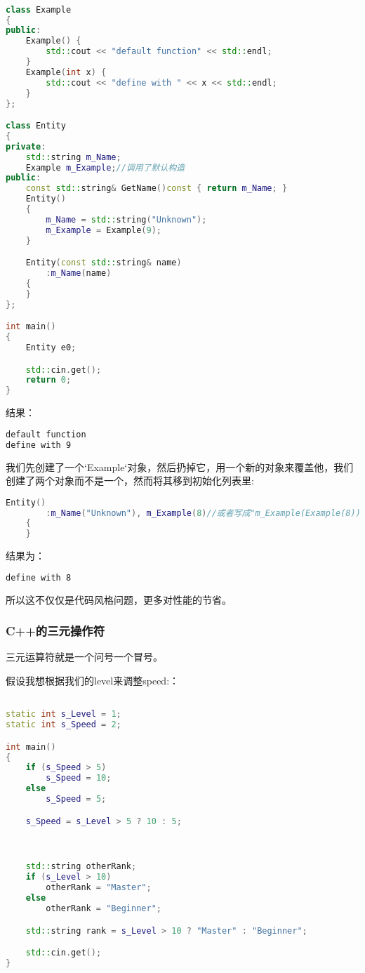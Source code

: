 \begin{lstlisting}[language=c++]

class Example
{
public:
    Example() {
        std::cout << "default function" << std::endl;
    }
    Example(int x) {
        std::cout << "define with " << x << std::endl;
    }
};

class Entity
{
private:
    std::string m_Name;
    Example m_Example;//调用了默认构造
public:
    const std::string& GetName()const { return m_Name; }
    Entity()
    {
        m_Name = std::string("Unknown");
        m_Example = Example(9);
    }

    Entity(const std::string& name)
        :m_Name(name)
    {
    }
};

int main()
{
    Entity e0;

    std::cin.get();
    return 0;
}

\end{lstlisting}

结果：

\begin{lstlisting}[language=bash]
default function
define with 9
\end{lstlisting}

我们先创建了一个`Example`对象，然后扔掉它，用一个新的对象来覆盖他，我们创建了两个对象而不是一个，然而将其移到初始化列表里:

\begin{lstlisting}[language=c++]
    Entity()
        :m_Name("Unknown"), m_Example(8)//或者写成"m_Example(Example(8))"
    {
    }
\end{lstlisting}

结果为：
\begin{lstlisting}[language=bash]
define with 8
\end{lstlisting}


所以这不仅仅是代码风格问题，更多对性能的节省。

\subsubsection{C++的三元操作符}

三元运算符就是一个问号一个冒号。

假设我想根据我们的{\ncodestyle level}来调整{\ncodestyle speed}:：

\begin{lstlisting}[language=c++]

static int s_Level = 1;
static int s_Speed = 2;

int main()
{
    if (s_Speed > 5)
        s_Speed = 10;
    else
        s_Speed = 5;

    s_Speed = s_Level > 5 ? 10 : 5;



    std::string otherRank;
    if (s_Level > 10)
        otherRank = "Master";
    else
        otherRank = "Beginner";

    std::string rank = s_Level > 10 ? "Master" : "Beginner";

    std::cin.get();
}
\end{lstlisting}


